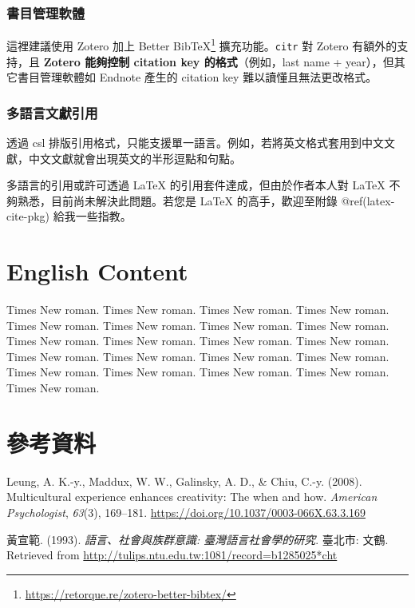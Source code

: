 \documentclass[]{book}
\let\oldhref=\href
\renewcommand{\href}[2]{#2\footnote{\url{#1}}}
\begin{document}
\hypertarget{ref-manager}{%
\subsection{書目管理軟體}\label{ref-manager}}

這裡建議使用 Zotero 加上
\href{https://retorque.re/zotero-better-bibtex/}{Better BibTeX}
擴充功能。\texttt{citr} 對 Zotero 有額外的支持，且 \textbf{Zotero
能夠控制 citation key 的格式}（例如，last name +
year），但其它書目管理軟體如 Endnote 產生的 citation key
難以讀懂且無法更改格式。

\hypertarget{multi-lang-cite}{%
\subsection{多語言文獻引用}\label{multi-lang-cite}}

透過 csl
排版引用格式，只能支援單一語言。例如，若將英文格式套用到中文文獻，中文文獻就會出現英文的半形逗點和句點。

多語言的引用或許可透過 LaTeX 的引用套件達成，但由於作者本人對 LaTeX
不夠熟悉，目前尚未解決此問題。若您是 LaTeX 的高手，歡迎至附錄
@ref(latex-cite-pkg) 給我一些指教。

\hypertarget{english-content}{%
\chapter{English Content}\label{english-content}}

Times New roman. Times New roman. Times New roman. Times New roman.
Times New roman. Times New roman. Times New roman. Times New roman.
Times New roman. Times New roman. Times New roman. Times New roman.
Times New roman. Times New roman. Times New roman. Times New roman.
Times New roman. Times New roman. Times New roman. Times New roman.
Times New roman. \renewcommand{\href}{\oldhref}

\hypertarget{references}{%
\chapter*{參考資料}\label{references}}

\hypertarget{refs}{}
\begin{cslreferences}
\leavevmode\hypertarget{ref-leung2008}{}%
Leung, A. K.-y., Maddux, W. W., Galinsky, A. D., \& Chiu, C.-y. (2008).
Multicultural experience enhances creativity: The when and how.
\emph{American Psychologist}, \emph{63}(3), 169--181.
\url{https://doi.org/10.1037/0003-066X.63.3.169}

\leavevmode\hypertarget{ref-huangxuanfan1993}{}%
黃宣範. (1993). \emph{語言、社會與族群意識: 臺灣語言社會學的研究}.
臺北市: 文鶴. Retrieved from
\url{http://tulips.ntu.edu.tw:1081/record=b1285025*cht}
\end{cslreferences}
\end{document}
